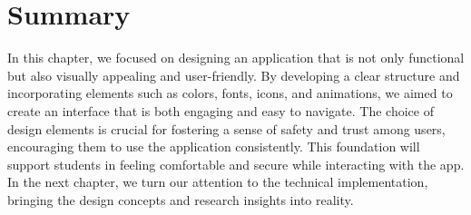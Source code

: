 \section{Summary}

In this chapter, we focused on designing an application that is not only functional but also visually appealing and user-friendly. By developing a clear structure and incorporating elements such as colors, fonts, icons, and animations, we aimed to create an interface that is both engaging and easy to navigate. The choice of design elements is crucial for fostering a sense of safety and trust among users, encouraging them to use the application consistently. This foundation will support students in feeling comfortable and secure while interacting with the app. In the next chapter, we turn our attention to the technical implementation, bringing the design concepts and research insights into reality.